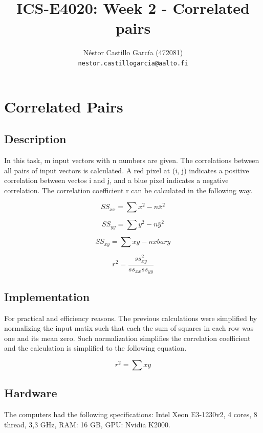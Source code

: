 \documentclass[a4paper,10pt]{article}
\title{ICS-E4020: Week 2 - Correlated pairs}
\author{Néstor Castillo García (472081)\\ 
       {\tt nestor.castillogarcia@aalto.fi}}
\begin{document}
\maketitle

\section{Correlated Pairs}

\subsection{Description}

In this task, m input vectors with n numbers are given. The correlations between all pairs of input vectors is calculated. A red pixel at (i, j) indicates a positive correlation between vectos i and j, and a blue pixel indicates a negative correlation. The correlation coefficient r can be calculated in the following way.

\begin{equation} \label{eq:pcaErrorc}
 SS_{xx} = \sum x^2 - n\bar{x}^2
 \end{equation} 

\begin{equation} \label{eq:pcaErrorc}
  SS_{yy} = \sum y^2 - n\bar{y}^2
\end{equation} 

\begin{equation} \label{eq:pcaErrorc}
 SS_{xy} = \sum xy - n\bar{x}bar{y}
\end{equation} 

\begin{equation} \label{eq:pcaErrorc}
 r^2 = \frac{ss_{xy}^2}{ss_{xx}ss_{yy}}
\end{equation} 


\subsection{Implementation}
For practical and efficiency reasons. The previous calculations were simplified by  normalizing the input matix such that each the sum of squares in each row was one and its mean zero. Such normalization simplifies the correlation coefficient and the calculation is simplified to the following equation.

\begin{equation} \label{eq:pcaErrorc}
 r^2 = \sum xy 
\end{equation} 

\subsection{Hardware}
The computers had the following specifications: Intel Xeon E3-1230v2, 4 cores, 8 thread, 3,3 GHz, RAM: 16 GB, GPU: Nvidia K2000.
\end{document}
